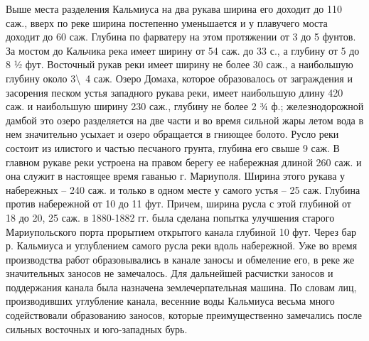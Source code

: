 Выше места разделения Кальмиуса на два рукава ширина его
доходит до 110 саж., вверх по реке ширина постепенно уменьшается и у плавучего
моста доходит до 60 саж. Глубина по фарватеру на этом протяжении от 3 до 5
фунтов. За мостом до Кальчика река имеет ширину от 54 саж. до 33 с., а глубину
от 5 до 8 ½ фут. Восточный рукав реки имеет ширину не более  30 саж., а
наибольшую глубину  около 3\textbackslash\ 4 саж. Озеро Домаха, которое образовалось от
заграждения и засорения песком устья западного рукава реки, имеет наибольшую
длину 420 саж. и наибольшую ширину 230 саж., глубину не более 2 ¾ ф.;
железнодорожной дамбой это озеро разделяется на две части и во время сильной
жары летом вода в нем значительно усыхает и озеро обращается в гниющее болото.
Русло реки состоит из илистого и частью песчаного грунта, глубина его свыше 9
саж. В главном рукаве реки устроена на правом берегу ее набережная длиной 260
саж. и она служит в настоящее время гаванью г. Мариуполя. Ширина этого рукава у
набережных – 240 саж. и только в одном месте у самого устья – 25 саж. Глубина
против набережной от 10 до 11 фут. Причем, ширина русла с этой глубиной от 18
до 20, 25 саж. в 1880-1882 гг. была сделана попытка улучшения старого
Мариупольского порта прорытием открытого канала глубиной 10 фут. Через бар р.
Кальмиуса и углублением самого русла реки вдоль набережной. Уже во время
производства работ образовывались в канале заносы и обмеление его, в реке же
значительных заносов не замечалось. Для дальнейшей расчистки заносов и
поддержания канала была назначена землечерпательная машина. По словам лиц,
производивших углубление канала, весенние воды Кальмиуса весьма много
содействовали образованию заносов, которые преимущественно замечались после
сильных восточных и юго-западных бурь.

